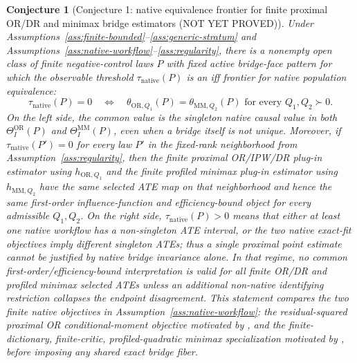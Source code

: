 \documentclass[11pt]{article}
\theoremstyle{definition}
\theoremstyle{plain}
\newtheorem{conjecture}{Conjecture}
\theoremstyle{remark}
\begin{document}
\begin{conjecture}[Conjecture 1: native equivalence frontier for finite proximal OR/DR and minimax bridge estimators (NOT YET PROVED)]\label{conj:penalty-separation}
Under Assumptions~\ref{ass:finite-bounded}--\ref{ass:generic-stratum} and
Assumptions~\ref{ass:native-workflow}--\ref{ass:regularity}, there is a
nonempty open class of finite negative-control laws \(P\) with fixed active
bridge-face pattern for which the observable threshold
\(\tau_{\mathrm{native}}(P)\) is an iff frontier for native population
equivalence:
\[
\tau_{\mathrm{native}}(P)=0
\quad\Longleftrightarrow\quad
\theta_{\mathrm{OR},Q_1}(P)=\theta_{\mathrm{MM},Q_2}(P)
\text{ for every }Q_1,Q_2\succ0 .
\]
On the left side, the common value is the singleton native causal value in
both \(\Theta_I^{\mathrm{OR}}(P)\) and \(\Theta_I^{\mathrm{MM}}(P)\), even
when a bridge itself is not unique.  Moreover, if
\(\tau_{\mathrm{native}}(P')=0\) for every law \(P'\) in the fixed-rank
neighborhood from Assumption~\ref{ass:regularity}, then the finite proximal
OR/IPW/DR plug-in estimator using \(h_{\mathrm{OR},Q_1}\) and the finite
profiled minimax plug-in estimator using \(h_{\mathrm{MM},Q_2}\) have the same
selected ATE map on that neighborhood and hence the same first-order
influence-function and efficiency-bound object for every admissible
\(Q_1,Q_2\).  On the right side,
\(\tau_{\mathrm{native}}(P)>0\) means that either at least one native
workflow has a non-singleton ATE interval, or the two native exact-fit
objectives imply different singleton ATEs; thus a single proximal point
estimate cannot be justified by native bridge invariance alone.  In that
regime, no common first-order/efficiency-bound interpretation is valid for
all finite OR/DR and profiled minimax selected ATEs unless an additional
non-native identifying restriction collapses the endpoint disagreement.  This
statement compares the two finite native objectives in
Assumption~\ref{ass:native-workflow}: the residual-squared proximal OR
conditional-moment objective motivated by
\citet{CuiPuShiMiaoTchetgen2024JASA}, and the finite-dictionary,
finite-critic, profiled-quadratic minimax specialization motivated by
\citet{KallusMaoUehara2021MinimaxNC}, before imposing any shared exact
bridge fiber.
\end{conjecture}
\end{document}
